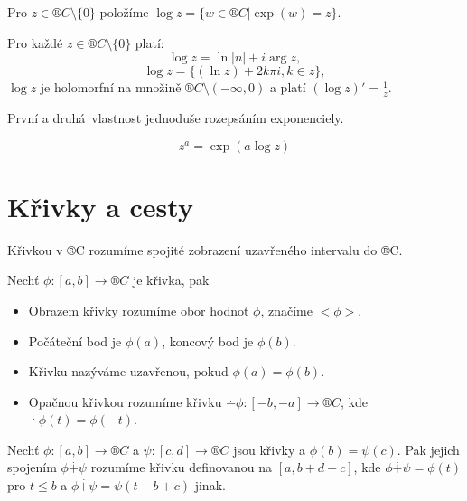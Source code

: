 \documentclass[12pt]{article}					%
\begin{document}

\begin{definice}[Log]
	Pro $z \in ®C \setminus\{0\}$ položíme $\log z = \{w \in ®C | \exp(w) = z\}$.
\end{definice}

\begin{veta}
	Pro každé $z \in ®C \setminus \{0\}$ platí:
	$$ \log z = \ln|n| + i \arg z, $$
	$$ \log z = \{(\ln z) + 2k\pi i, k \in z\}, $$
	$\log z$ je holomorfní na množině $®C \setminus(-∞, 0)$ a platí $(\log z)' = \frac{1}{z}$.

	\begin{dukazin}
		První a druhá vlastnost jednoduše rozepsáním exponenciely.


	\end{dukazin}
\end{veta}

\begin{definice}
	$$ z^a = \exp (a \log z) $$
\end{definice}

\section{Křivky a cesty}
\begin{definice}[Křivka]
	Křivkou v ®C rozumíme spojité zobrazení uzavřeného intervalu do ®C.
\end{definice}

\begin{definice}
	Nechť $\phi: [a, b] \rightarrow ®C$ je křivka, pak
	\begin{itemize}
		\item Obrazem křivky rozumíme obor hodnot $\phi$, značíme $<\phi>$.
		\item Počáteční bod je $\phi(a)$, koncový bod je $\phi(b)$.
		\item Křivku nazýváme uzavřenou, pokud $\phi(a) = \phi(b)$.
		\item Opačnou křivkou rozumíme křivku $\overset{.}{-} \phi: [-b, -a] \rightarrow ®C$, kde $\overset{.}{-} \phi(t) = \phi(-t)$.
	\end{itemize}
\end{definice}

\begin{definice}[Spojení]
	Nechť $\phi: [a, b] \rightarrow ®C$ a $\psi: [c, d] \rightarrow ®C$ jsou křivky a $\phi(b) = \psi(c)$. Pak jejich spojením $\phi \overset{.}{+} \psi$ rozumíme křivku definovanou na $[a, b + d - c]$, kde $\phi \overset{.}{+} \psi = \phi(t)$ pro $t ≤ b$ a $\phi \overset{.}{+} \psi = \psi(t-b+c)$ jinak.
\end{definice}
\end{document}
